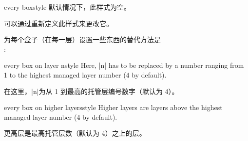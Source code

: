 \begin{docTcbKey}{every box}{}{style}
默认情况下，此样式为空。
\begin{dispListing}
\end{dispListing}
可以通过重新定义此样式来更改它。
\begin{dispListing}
\end{dispListing}

\medskip
\begin{marker}
为每个盒子（在每一层）设置一些东西的替代方法是\\
:
\begin{dispListing}
\end{dispListing}
\end{marker}
\end{docTcbKey}




\begin{docTcbKey}{every box on layer n}{}{style}
Here, |n| has to be replaced by a number ranging from 1 to the highest
managed layer number (4 by default).

在这里，|n|为从 1 到最高的托管层编号数字（默认为 4）。
\begin{dispListing}
\end{dispListing}
\end{docTcbKey}


\begin{docTcbKey}{every box on higher layers}{}{style}
Higher layers are layers above the highest
managed layer number (4 by default).

更高层是最高托管层数（默认为 4）之上的层。
\begin{dispListing}
\end{dispListing}
\end{docTcbKey}




